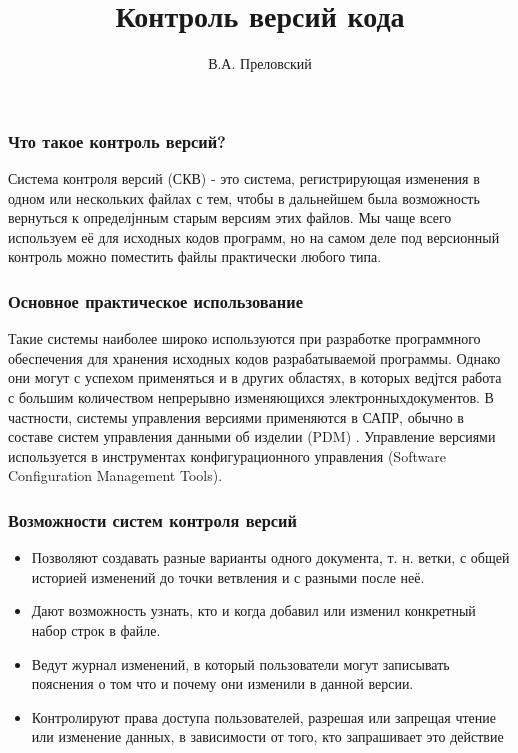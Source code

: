 \documentclass[14pt]{beamer}
\begin{document}
	\author{В.А. Преловский}
	\title{Контроль версий кода}
	\frame[plain]{\maketitle}
	
	\begin{frame}
		\frametitle{Что такое контроль версий?}
		
		Система контроля версий (СКВ) - это система, регистрирующая изменения в одном или нескольких файлах с тем, чтобы в дальнейшем была возможность вернуться к определјнным старым версиям этих файлов.
		Мы чаще всего используем её для исходных кодов программ, но на самом деле под версионный контроль можно поместить файлы практически любого типа.
	\end{frame}

	\begin{frame}
		\frametitle{Основное практическое использование}
		
		{\small Такие системы наиболее широко используются при разработке программного обеспечения для хранения исходных кодов разрабатываемой
		программы. Однако они могут с успехом применяться и в других областях,
		в которых ведјтся работа с большим количеством непрерывно изменяющихся электронныхдокументов. В частности, системы управления версиями применяются в САПР, обычно в составе систем управления данными об
		изделии (PDM) . Управление версиями используется в инструментах конфигурационного управления (Software Configuration Management Tools).
	}
	\end{frame}

\begin{frame}
	\frametitle{Возможности систем контроля версий}
	{\footnotesize 
		\begin{itemize}
			\item Позволяют создавать разные варианты одного документа, т. н. ветки,
			с общей историей изменений до точки ветвления и с разными после
			неё.
			\item Дают возможность узнать, кто и когда добавил или изменил конкретный набор строк в файле.
			\item Ведут журнал изменений, в который пользователи могут записывать пояснения о том что и почему они изменили в данной версии.
			\item 	Контролируют права доступа пользователей, разрешая или запрещая	чтение или изменение данных, в зависимости от того, кто запрашивает это действие
		\end{itemize}
	}
\end{frame}
\end{document}
